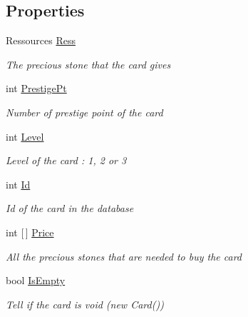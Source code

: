 \subsection*{Properties}
\begin{DoxyCompactItemize}
\item 
Ressources \hyperlink{class_splendor_1_1_card_afcfaa7ea5072b3cd30c04adddc8dd5c7}{Ress}
\begin{DoxyCompactList}\small\item\em The precious stone that the card gives \end{DoxyCompactList}\item 
int \hyperlink{class_splendor_1_1_card_a117119ceac083b7b7d39f11e5bbd7225}{Prestige\+Pt}
\begin{DoxyCompactList}\small\item\em Number of prestige point of the card \end{DoxyCompactList}\item 
int \hyperlink{class_splendor_1_1_card_aadc9953aeb322c82e04fbd9b5a3b996d}{Level}
\begin{DoxyCompactList}\small\item\em Level of the card \+: 1, 2 or 3 \end{DoxyCompactList}\item 
int \hyperlink{class_splendor_1_1_card_a1f2c57b133f35a3471ae86c9dc1727f6}{Id}
\begin{DoxyCompactList}\small\item\em Id of the card in the database \end{DoxyCompactList}\item 
int \mbox{[}$\,$\mbox{]} \hyperlink{class_splendor_1_1_card_afee1b5ccf0c6745bdd9b7642a0158fae}{Price}
\begin{DoxyCompactList}\small\item\em All the precious stones that are needed to buy the card \end{DoxyCompactList}\item 
bool \hyperlink{class_splendor_1_1_card_a3fb8ceaff1e5e581667aee29a8b70435}{Is\+Empty}
\begin{DoxyCompactList}\small\item\em Tell if the card is void (new Card()) \end{DoxyCompactList}\end{DoxyCompactItemize}


